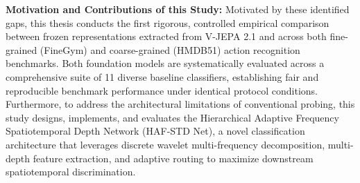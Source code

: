 \textbf{Motivation and Contributions of this Study:} Motivated by these identified gaps, this thesis conducts the first rigorous, controlled empirical comparison between frozen representations extracted from V-JEPA 2.1 and \qwenvl{} across both fine-grained (FineGym) and coarse-grained (HMDB51) action recognition benchmarks. Both foundation models are systematically evaluated across a comprehensive suite of 11 diverse baseline classifiers, establishing fair and reproducible benchmark performance under identical protocol conditions. Furthermore, to address the architectural limitations of conventional probing, this study designs, implements, and evaluates the Hierarchical Adaptive Frequency Spatiotemporal Depth Network (HAF-STD Net), a novel classification architecture that leverages discrete wavelet multi-frequency decomposition, multi-depth feature extraction, and adaptive routing to maximize downstream spatiotemporal discrimination.
